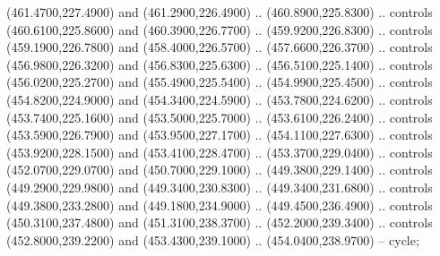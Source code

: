 {\begin{scope}[y=0.80pt, x=0.80pt, yscale=-1, xscale=1, inner sep=0pt, outer sep=0pt, #1]
      (461.4700,227.4900) and (461.2900,226.4900) .. (460.8900,225.8300) .. controls
      (460.6100,225.8600) and (460.3900,226.7700) .. (459.9200,226.8300) .. controls
      (459.1900,226.7800) and (458.4000,226.5700) .. (457.6600,226.3700) .. controls
      (456.9800,226.3200) and (456.8300,225.6300) .. (456.5100,225.1400) .. controls
      (456.0200,225.2700) and (455.4900,225.5400) .. (454.9900,225.4500) .. controls
      (454.8200,224.9000) and (454.3400,224.5900) .. (453.7800,224.6200) .. controls
      (453.7400,225.1600) and (453.5000,225.7000) .. (453.6100,226.2400) .. controls
      (453.5900,226.7900) and (453.9500,227.1700) .. (454.1100,227.6300) .. controls
      (453.9200,228.1500) and (453.4100,228.4700) .. (453.3700,229.0400) .. controls
      (452.0700,229.0700) and (450.7000,229.1000) .. (449.3800,229.1400) .. controls
      (449.2900,229.9800) and (449.3400,230.8300) .. (449.3400,231.6800) .. controls
      (449.3800,233.2800) and (449.1800,234.9000) .. (449.4500,236.4900) .. controls
      (450.3100,237.4800) and (451.3100,238.3700) .. (452.2000,239.3400) .. controls
      (452.8000,239.2200) and (453.4300,239.1000) .. (454.0400,238.9700) -- cycle;


\end{scope}}
